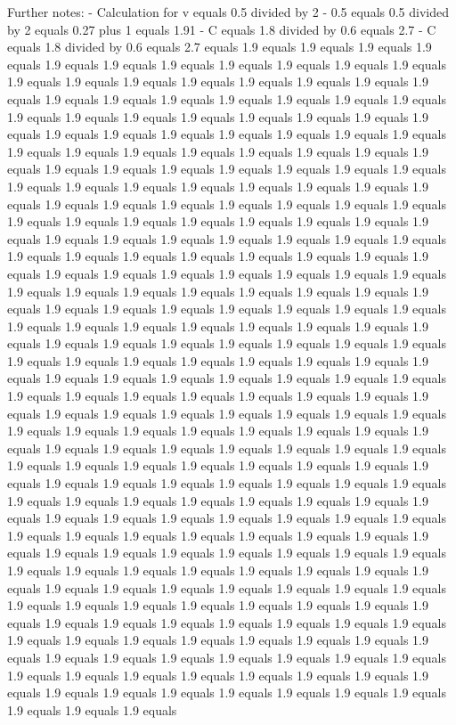 Further notes:
- Calculation for v equals 0.5 divided by 2
- 0.5 equals 0.5 divided by 2 equals 0.27 plus 1 equals 1.91
- C equals 1.8 divided by 0.6 equals 2.7
- C equals 1.8 divided by 0.6 equals 2.7 equals 1.9 equals 1.9 equals 1.9 equals 1.9 equals 1.9 equals 1.9 equals 1.9 equals 1.9 equals 1.9 equals 1.9 equals 1.9 equals 1.9 equals 1.9 equals 1.9 equals 1.9 equals 1.9 equals 1.9 equals 1.9 equals 1.9 equals 1.9 equals 1.9 equals 1.9 equals 1.9 equals 1.9 equals 1.9 equals 1.9 equals 1.9 equals 1.9 equals 1.9 equals 1.9 equals 1.9 equals 1.9 equals 1.9 equals 1.9 equals 1.9 equals 1.9 equals 1.9 equals 1.9 equals 1.9 equals 1.9 equals 1.9 equals 1.9 equals 1.9 equals 1.9 equals 1.9 equals 1.9 equals 1.9 equals 1.9 equals 1.9 equals 1.9 equals 1.9 equals 1.9 equals 1.9 equals 1.9 equals 1.9 equals 1.9 equals 1.9 equals 1.9 equals 1.9 equals 1.9 equals 1.9 equals 1.9 equals 1.9 equals 1.9 equals 1.9 equals 1.9 equals 1.9 equals 1.9 equals 1.9 equals 1.9 equals 1.9 equals 1.9 equals 1.9 equals 1.9 equals 1.9 equals 1.9 equals 1.9 equals 1.9 equals 1.9 equals 1.9 equals 1.9 equals 1.9 equals 1.9 equals 1.9 equals 1.9 equals 1.9 equals 1.9 equals 1.9 equals 1.9 equals 1.9 equals 1.9 equals 1.9 equals 1.9 equals 1.9 equals 1.9 equals 1.9 equals 1.9 equals 1.9 equals 1.9 equals 1.9 equals 1.9 equals 1.9 equals 1.9 equals 1.9 equals 1.9 equals 1.9 equals 1.9 equals 1.9 equals 1.9 equals 1.9 equals 1.9 equals 1.9 equals 1.9 equals 1.9 equals 1.9 equals 1.9 equals 1.9 equals 1.9 equals 1.9 equals 1.9 equals 1.9 equals 1.9 equals 1.9 equals 1.9 equals 1.9 equals 1.9 equals 1.9 equals 1.9 equals 1.9 equals 1.9 equals 1.9 equals 1.9 equals 1.9 equals 1.9 equals 1.9 equals 1.9 equals 1.9 equals 1.9 equals 1.9 equals 1.9 equals 1.9 equals 1.9 equals 1.9 equals 1.9 equals 1.9 equals 1.9 equals 1.9 equals 1.9 equals 1.9 equals 1.9 equals 1.9 equals 1.9 equals 1.9 equals 1.9 equals 1.9 equals 1.9 equals 1.9 equals 1.9 equals 1.9 equals 1.9 equals 1.9 equals 1.9 equals 1.9 equals 1.9 equals 1.9 equals 1.9 equals 1.9 equals 1.9 equals 1.9 equals 1.9 equals 1.9 equals 1.9 equals 1.9 equals 1.9 equals 1.9 equals 1.9 equals 1.9 equals 1.9 equals 1.9 equals 1.9 equals 1.9 equals 1.9 equals 1.9 equals 1.9 equals 1.9 equals 1.9 equals 1.9 equals 1.9 equals 1.9 equals 1.9 equals 1.9 equals 1.9 equals 1.9 equals 1.9 equals 1.9 equals 1.9 equals 1.9 equals 1.9 equals 1.9 equals 1.9 equals 1.9 equals 1.9 equals 1.9 equals 1.9 equals 1.9 equals 1.9 equals 1.9 equals 1.9 equals 1.9 equals 1.9 equals 1.9 equals 1.9 equals 1.9 equals 1.9 equals 1.9 equals 1.9 equals 1.9 equals 1.9 equals 1.9 equals 1.9 equals 1.9 equals 1.9 equals 1.9 equals 1.9 equals 1.9 equals 1.9 equals 1.9 equals 1.9 equals 1.9 equals 1.9 equals 1.9 equals 1.9 equals 1.9 equals 1.9 equals 1.9 equals 1.9 equals 1.9 equals 1.9 equals 1.9 equals 1.9 equals 1.9 equals 1.9 equals 1.9 equals 1.9 equals 1.9 equals 1.9 equals 1.9 equals 1.9 equals 1.9 equals 1.9 equals 1.9 equals 1.9 equals 1.9 equals 1.9 equals 1.9 equals 1.9 equals 1.9 equals 1.9 equals 1.9 equals 1.9 equals 1.9 equals 1.9 equals 1.9 equals 1.9 equals 1.9 equals 1.9 equals 1.9 equals 1.9 equals 1.9 equals 1.9 equals 1.9 equals 1.9 equals 1.9 equals 1.9 equals 1.9 equals 1.9 equals 1.9 equals 1.9 equals 1.9 equals 1.9 equals 1.9 equals 1.9 equals 1.9 equals 1.9 equals 